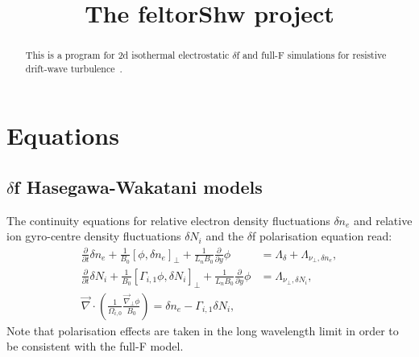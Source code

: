 





\title{The feltorShw project}
\maketitle

\begin{abstract}
    This is a program for 2d isothermal electrostatic \(\delta\)f and full-F simulations for resistive drift-wave turbulence~\cite{HeldPhd}.
\end{abstract}
\section{Equations}
\subsection{\(\delta\)f Hasegawa-Wakatani models}
The continuity equations for relative electron density fluctuations \(\delta n_e\) and relative ion gyro-centre density fluctuations  \(\delta N_i\) and the \(\delta\)f polarisation equation read:
\begin{align}
 \frac{\partial}{\partial t }\delta n_e + \frac{1}{B_0} \left[\phi,\delta n_e\right]_{\perp}  +\frac{1}{L_n B_0}  \frac{\partial }{\partial y} \phi  &= \Lambda_\delta + \Lambda_{\nu_\perp,\delta n_e}
,\\
 \frac{\partial}{\partial t }\delta N_i +\frac{1}{B_0} \left[\Gamma_{i,1}\phi,\delta N_i \right]_{\perp}   +\frac{1}{L_n B_0}  \frac{\partial }{\partial y}\phi  &= \Lambda_{\nu_\perp,\delta N_i},\\
 \vec{\nabla} \cdot \left(\frac{1}{\Omega_{i,0}} \frac{\vec{\nabla}_\perp \phi}{B_0}\right)= \delta n_e - \Gamma_{i,1}\delta N_i,
\end{align}
Note that polarisation effects are taken in the long wavelength limit in order to be consistent with the full-F model.
